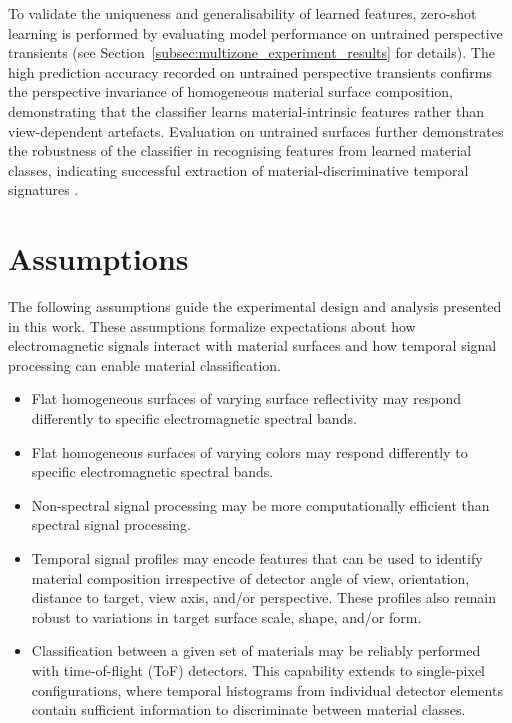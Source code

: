 \documentclass[12pt,a4paper,oneside]{report}
\let\oldsection\section
\renewcommand{\section}{\clearpage\oldsection}
\begin{document}
To validate the uniqueness and generalisability of learned features, zero-shot learning is performed by evaluating model performance on untrained perspective transients (see Section~\ref{subsec:multizone_experiment_results} for details). The high prediction accuracy recorded on untrained perspective transients confirms the perspective invariance of homogeneous material surface composition, demonstrating that the classifier learns material-intrinsic features rather than view-dependent artefacts. Evaluation on untrained surfaces further demonstrates the robustness of the classifier in recognising features from learned material classes, indicating successful extraction of material-discriminative temporal signatures \cite{jungerman2022}.

\newpage
\section{Assumptions}
\label{sec:assumptions}

The following assumptions guide the experimental design and analysis presented in this work. These assumptions formalize expectations about how electromagnetic signals interact with material surfaces and how temporal signal processing can enable material classification.

\begin{itemize}
    \item Flat homogeneous surfaces of varying surface reflectivity may respond differently to specific electromagnetic spectral bands.
    
    \item Flat homogeneous surfaces of varying colors may respond differently to specific electromagnetic spectral bands.
    
    \item Non-spectral signal processing may be more computationally efficient than spectral signal processing.
    
    \item Temporal signal profiles may encode features that can be used to identify material composition irrespective of detector angle of view, orientation, distance to target, view axis, and/or perspective. These profiles also remain robust to variations in target surface scale, shape, and/or form.
    
    \item Classification between a given set of materials may be reliably performed with time-of-flight (ToF) detectors. This capability extends to single-pixel configurations, where temporal histograms from individual detector elements contain sufficient information to discriminate between material classes.
\end{itemize}
\end{document}
